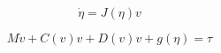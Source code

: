 \begin{equation}
    \dot{\eta} = J(\eta)v\label{eq1}
\end{equation}

\begin{equation}
    M\dot{v}+C(v)v+D(v)v+g(\eta)=\tau\label{eq2}
\end{equation}